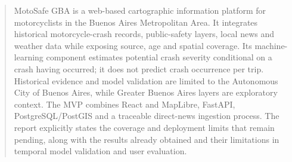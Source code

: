 
\begin{abstract}

MotoSafe GBA is a web-based cartographic information platform for
motorcyclists in the Buenos Aires Metropolitan Area. It integrates
historical motorcycle-crash records, public-safety layers, local news
and weather data while exposing source, age and spatial coverage. Its
machine-learning component estimates potential crash severity
conditional on a crash having occurred; it does not predict crash
occurrence per trip. Historical evidence and model validation are
limited to the Autonomous City of Buenos Aires, while Greater Buenos
Aires layers are exploratory context. The MVP combines React and
MapLibre, FastAPI, PostgreSQL/PostGIS and a traceable direct-news
ingestion process. The report explicitly states the coverage and
deployment limits that remain pending, along with the results already
obtained and their limitations in temporal model validation and user
evaluation.

\end{abstract}

